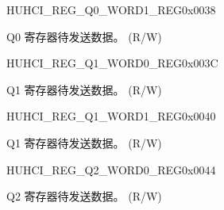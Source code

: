 \begin{register}{H}{UHCI\_REG\_Q0\_WORD1\_REG}{0x0038}\label{regdesc:UHCIREGQ0WORD1REG}
%
\regnewline%
\begin{regdesc}\begin{reglist}
\label{fielddesc:UHCISENDQ0WORD1}\item [UHCI\_SEND\_Q0\_WORD1] Q0 寄存器待发送数据。 (R/W)
\end{reglist}\end{regdesc}
\end{register}


\begin{register}{H}{UHCI\_REG\_Q1\_WORD0\_REG}{0x003C}\label{regdesc:UHCIREGQ1WORD0REG}
%
\regnewline%
\begin{regdesc}\begin{reglist}
\label{fielddesc:UHCISENDQ1WORD0}\item [UHCI\_SEND\_Q1\_WORD0] Q1 寄存器待发送数据。 (R/W)
\end{reglist}\end{regdesc}
\end{register}


\begin{register}{H}{UHCI\_REG\_Q1\_WORD1\_REG}{0x0040}\label{regdesc:UHCIREGQ1WORD1REG}
%
\regnewline%
\begin{regdesc}\begin{reglist}
\label{fielddesc:UHCISENDQ1WORD1}\item [UHCI\_SEND\_Q1\_WORD1] Q1 寄存器待发送数据。 (R/W)
\end{reglist}\end{regdesc}
\end{register}


\begin{register}{H}{UHCI\_REG\_Q2\_WORD0\_REG}{0x0044}\label{regdesc:UHCIREGQ2WORD0REG}
%
\regnewline%
\begin{regdesc}\begin{reglist}
\label{fielddesc:UHCISENDQ2WORD0}\item [UHCI\_SEND\_Q2\_WORD0] Q2 寄存器待发送数据。 (R/W)
\end{reglist}\end{regdesc}
\end{register}


